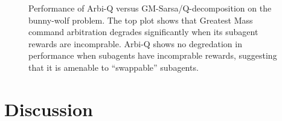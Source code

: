 \begin{figure}[ht]
  \begin{center}
    \caption{Performance of Arbi-Q versus GM-Sarsa/Q-decomposition on the bunny-wolf problem. The top plot shows that Greatest Mass command arbitration degrades significantly when its subagent rewards are incomprable. Arbi-Q shows no degredation in performance when subagents have incomprable rewards, suggesting that it is amenable to ``swappable'' subagents.}
  \end{center}
  \label{fig:gmresults}
\end{figure}


\section{Discussion}
